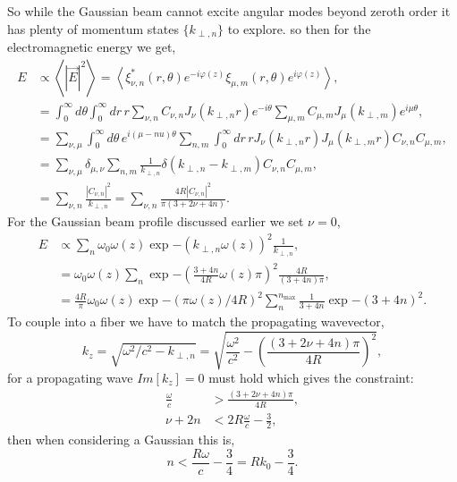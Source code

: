\documentclass{article}
\begin{document}
So while the Gaussian beam cannot excite angular modes beyond zeroth order it has plenty of momentum states $\{k_{\perp,n}\}$ to explore. so then for the electromagnetic energy we get,
\begin{align*}
  E&\propto\left<|\vec{E}|^2\right>=\left<\xi^*_{\nu,n}(r,\theta)e^{-i\varphi(z)}\xi_{\mu,m}(r,\theta)e^{i\varphi(z)}\right>,\\
  &=\int_0^{\infty}d\theta\int_0^{\infty}dr\,r\sum_{\nu,n}C_{\nu,n}J_{\nu}(k_{\perp,n}r)e^{-i\theta}\sum_{\mu,m}C_{\mu,m}J_{\mu}(k_{\perp,m})e^{i\mu\theta},\\
  &=\sum_{\nu,\mu}\int_0^{\infty}d\theta\,e^{i(\mu-nu)\theta}\sum_{n,m}\int_0^{\infty}dr\,rJ_{\nu}(k_{\perp,n}r)J_{\mu}(k_{\perp,m}r)C_{\nu,n}C_{\mu,m},\\
  &=\sum_{\nu,\mu}\delta_{\mu,\nu}\sum_{n,m}\frac{1}{k_{\perp,n}}\delta(k_{\perp,n}-k_{\perp,m})C_{\nu,n}C_{\mu,m},\\
  &=\sum_{\nu,n}\frac{|C_{\nu,n}|^2}{k_{\perp,n}}=\sum_{\nu,n}\frac{4R|C_{\nu,n}|^2}{\pi(3+2\nu+4n)}.
\end{align*}
For the Gaussian beam profile discussed earlier we set $\nu=0$,
\begin{align*}
  E&\propto\sum_{n}\omega_0\omega(z)\exp{-\left(k_{\perp,n}\omega(z)\right)^2}\frac{1}{k_{\perp,n}},\\
  &=\omega_0\omega(z)\sum_{n}\exp{-\left(\frac{3+4n}{4R}\omega(z)\pi\right)^2}\frac{4R}{(3+4n)\pi},\\
  &=\frac{4R}{\pi}\omega_0\omega(z)\exp{-\left(\pi\omega(z)/4R\right)^2}\sum_{n}^{n_{\text{max}}}\frac{1}{3+4n}\exp{-\left(3+4n\right)^2}.
\end{align*}
To couple into a fiber we have to match the propagating wavevector,
\begin{equation*}
  k_z=\sqrt{\omega^2/c^2-k_{\perp,n}}=\sqrt{\frac{\omega^2}{c^2}-\left(\frac{(3+2\nu+4n)\pi}{4R}\right)^2},
\end{equation*}
for a propagating wave $Im\left[k_z\right]=0$ must hold which gives the constraint:
\begin{align*}
  \frac{\omega}{c}&>\frac{(3+2\nu+4n)\pi}{4R},\\
  \nu+2n&<2R\frac{\omega}{c}-\frac{3}{2},
\end{align*}
then when considering a Gaussian this is,
\begin{equation*}
  n<\frac{R\omega}{c}-\frac{3}{4}=Rk_0-\frac{3}{4}.
\end{equation*}
\end{document}
